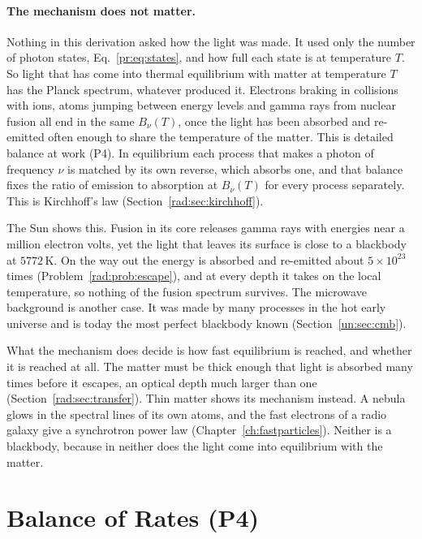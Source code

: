 \paragraph{The mechanism does not matter.} Nothing in this derivation asked how the light was made. It used only the number of photon states, Eq.~\eqref{pr:eq:states}, and how full each state is at temperature $T$. So light that has come into thermal equilibrium with matter at temperature $T$ has the Planck spectrum, whatever produced it. Electrons braking in collisions with ions, atoms jumping between energy levels and gamma rays from nuclear fusion all end in the same $B_\nu(T)$, once the light has been absorbed and re-emitted often enough to share the temperature of the matter. This is detailed balance at work (P4). In equilibrium each process that makes a photon of frequency $\nu$ is matched by its own reverse, which absorbs one, and that balance fixes the ratio of emission to absorption at $B_\nu(T)$ for every process separately. This is Kirchhoff's law (Section~\ref{rad:sec:kirchhoff}).

The Sun shows this. Fusion in its core releases gamma rays with energies near a million electron volts, yet the light that leaves its surface is close to a blackbody at $5772\,\mathrm K$. On the way out the energy is absorbed and re-emitted about $5\times10^{23}$ times (Problem~\ref{rad:prob:escape}), and at every depth it takes on the local temperature, so nothing of the fusion spectrum survives. The microwave background is another case. It was made by many processes in the hot early universe and is today the most perfect blackbody known (Section~\ref{un:sec:cmb}).

What the mechanism does decide is how fast equilibrium is reached, and whether it is reached at all. The matter must be thick enough that light is absorbed many times before it escapes, an optical depth much larger than one (Section~\ref{rad:sec:transfer}). Thin matter shows its mechanism instead. A nebula glows in the spectral lines of its own atoms, and the fast electrons of a radio galaxy give a synchrotron power law (Chapter~\ref{ch:fastparticles}). Neither is a blackbody, because in neither does the light come into equilibrium with the matter.

\section{Balance of Rates (P4)}
\label{pr:sec:p4}

